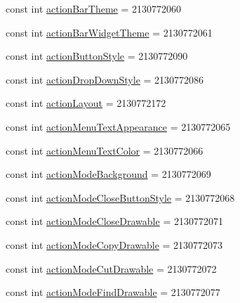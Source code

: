 \begin{DoxyCompactItemize}
\item 
const int \mbox{\hyperlink{class_f_w_p_s___app_1_1_droid_1_1_resource_1_1_attribute_a9cc212fe1cb63e65acee165c773b5f65}{action\+Bar\+Theme}} = 2130772060
\item 
const int \mbox{\hyperlink{class_f_w_p_s___app_1_1_droid_1_1_resource_1_1_attribute_ad3fd4fce673c0af1694ecb9792ac5111}{action\+Bar\+Widget\+Theme}} = 2130772061
\item 
const int \mbox{\hyperlink{class_f_w_p_s___app_1_1_droid_1_1_resource_1_1_attribute_a7f06bd1515984589285a80f9ec719ba3}{action\+Button\+Style}} = 2130772090
\item 
const int \mbox{\hyperlink{class_f_w_p_s___app_1_1_droid_1_1_resource_1_1_attribute_aa9079650d566f13f1f04bad1ca2a9089}{action\+Drop\+Down\+Style}} = 2130772086
\item 
const int \mbox{\hyperlink{class_f_w_p_s___app_1_1_droid_1_1_resource_1_1_attribute_ad9cc6b13b7625fec696b9bbc31804c7d}{action\+Layout}} = 2130772172
\item 
const int \mbox{\hyperlink{class_f_w_p_s___app_1_1_droid_1_1_resource_1_1_attribute_af9c43f75545d0e89cc72359ed23214d9}{action\+Menu\+Text\+Appearance}} = 2130772065
\item 
const int \mbox{\hyperlink{class_f_w_p_s___app_1_1_droid_1_1_resource_1_1_attribute_a68efe60725950500bdbf4e96c3c2a95a}{action\+Menu\+Text\+Color}} = 2130772066
\item 
const int \mbox{\hyperlink{class_f_w_p_s___app_1_1_droid_1_1_resource_1_1_attribute_a2e3d305be50ec7fb8b8d66b508c6204e}{action\+Mode\+Background}} = 2130772069
\item 
const int \mbox{\hyperlink{class_f_w_p_s___app_1_1_droid_1_1_resource_1_1_attribute_aa367085c349ad503e1953b6256dd1c94}{action\+Mode\+Close\+Button\+Style}} = 2130772068
\item 
const int \mbox{\hyperlink{class_f_w_p_s___app_1_1_droid_1_1_resource_1_1_attribute_a4dfd1c71b060800b142d440ccbdec82a}{action\+Mode\+Close\+Drawable}} = 2130772071
\item 
const int \mbox{\hyperlink{class_f_w_p_s___app_1_1_droid_1_1_resource_1_1_attribute_af4acbe2bdc4767977eac526ab1fad2aa}{action\+Mode\+Copy\+Drawable}} = 2130772073
\item 
const int \mbox{\hyperlink{class_f_w_p_s___app_1_1_droid_1_1_resource_1_1_attribute_ac0c9d2586074d844b048ef2e250dbf5e}{action\+Mode\+Cut\+Drawable}} = 2130772072
\item 
const int \mbox{\hyperlink{class_f_w_p_s___app_1_1_droid_1_1_resource_1_1_attribute_a3714c2a43bd6936e3fc7febec1d6bfd8}{action\+Mode\+Find\+Drawable}} = 2130772077

\end{DoxyCompactItemize}
